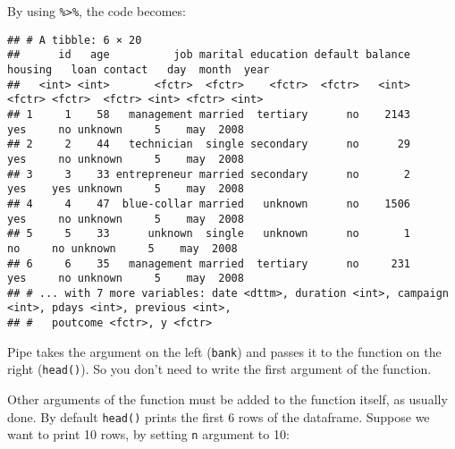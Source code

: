 \documentclass[]{book}
\newenvironment{Shaded}{\begin{snugshade}}{\end{snugshade}}
\newcommand{\KeywordTok}[1]{\textcolor[rgb]{0.13,0.29,0.53}{\textbf{{#1}}}}
\newcommand{\DataTypeTok}[1]{\textcolor[rgb]{0.13,0.29,0.53}{{#1}}}
\newcommand{\DecValTok}[1]{\textcolor[rgb]{0.00,0.00,0.81}{{#1}}}
\newcommand{\StringTok}[1]{\textcolor[rgb]{0.31,0.60,0.02}{{#1}}}
\newcommand{\NormalTok}[1]{{#1}}
\begin{document}
By using \texttt{\%\textgreater{}\%}, the code becomes:

\begin{Shaded}
\end{Shaded}

\begin{verbatim}
## # A tibble: 6 × 20
##      id   age          job marital education default balance housing   loan contact   day  month  year
##   <int> <int>       <fctr>  <fctr>    <fctr>  <fctr>   <int>  <fctr> <fctr>  <fctr> <int> <fctr> <int>
## 1     1    58   management married  tertiary      no    2143     yes     no unknown     5    may  2008
## 2     2    44   technician  single secondary      no      29     yes     no unknown     5    may  2008
## 3     3    33 entrepreneur married secondary      no       2     yes    yes unknown     5    may  2008
## 4     4    47  blue-collar married   unknown      no    1506     yes     no unknown     5    may  2008
## 5     5    33      unknown  single   unknown      no       1      no     no unknown     5    may  2008
## 6     6    35   management married  tertiary      no     231     yes     no unknown     5    may  2008
## # ... with 7 more variables: date <dttm>, duration <int>, campaign <int>, pdays <int>, previous <int>,
## #   poutcome <fctr>, y <fctr>
\end{verbatim}

Pipe takes the argument on the left (\texttt{bank}) and passes it to the
function on the right (\texttt{head()}). So you don't need to write the
first argument of the function.

Other arguments of the function must be added to the function itself, as
usually done. By default \texttt{head()} prints the first 6 rows of the
dataframe. Suppose we want to print 10 rows, by setting \texttt{n}
argument to 10:

\begin{Shaded}
\end{Shaded}
\end{document}
